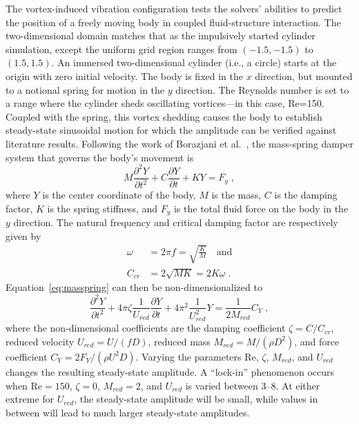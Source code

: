 \documentclass[preprint,12pt]{elsarticle}
\newcommand{ \ddt } [1] { \frac{ \partial #1 }{ \partial t } }
\newcommand{ \ddydxx } [2] { \frac{ \partial^2 #1 }{ \partial #2^2 } }
\begin{document}
The vortex-induced vibration configuration tests the solvers' abilities to predict the
position of a freely moving body in coupled fluid-structure interaction.
The two-dimensional domain matches that as the impulsively started cylinder simulation,
except the uniform grid region ranges from $(-1.5, -1.5)$ to $(1.5, 1.5)$.
An immersed two-dimensional cylinder (i.e., a circle) starts at the origin with
zero initial velocity. The body is fixed in the $x$ direction, but mounted to a
notional spring for motion in the $y$ direction.
The Reynolds number is set to a range where
the cylinder sheds oscillating vortices---in this case, Re=150.
Coupled with the spring, this vortex shedding causes the body to establish
steady-state sinusoidal motion
for which the amplitude can be verified against literature results.
Following the work of Borazjani et al.~\cite{borazjani2008curvilinear}, the mass-spring
damper system that governs the body's movement is
\begin{equation}
    M \ddydxx{Y}{t} + C \ddt{Y} + KY = F_y \;, \label{eq:masspring}
\end{equation}
where $Y$ is the center coordinate of the body, $M$ is the mass, $C$ is the damping factor,
$K$ is the spring stiffness, and $F_y$ is the total fluid force on the body in the $y$ direction.
The natural frequency and critical damping factor are respectively given by
\begin{align}
    \omega &= 2\pi f = \sqrt{\frac{K}{M}} \quad \text{and} \label{eq:nf}\\
    C_{cr} &= 2\sqrt{MK} = 2K\omega \;. \label{eq:cd}
\end{align}
Equation~\eqref{eq:masspring} can then be non-dimensionalized to
\begin{equation}
    \frac{\partial^2 Y}{\partial t^2}+4\pi \zeta\frac{1}{U_{red}}\frac{\partial Y}{\partial t}
     + 4\pi^2\frac{1}{U_{red}^2}Y=\frac{1}{2M_{red}}C_Y \;,
     \label{eq:ndmasspring}
\end{equation}
where the non-dimensional coefficients are the damping coefficient $\zeta=C / C_{cr}$,
reduced velocity $U_{red}=U / (fD)$, reduced mass $M_{red}=M / \left(\rho D^2 \right)$,
and force coefficient $C_Y= 2 F_Y  / \left( \rho U^2 D \right)$.
Varying the parameters Re, $\zeta$,
$M_{red}$, and $U_{red}$ changes the resulting steady-state amplitude.
A ``lock-in'' phenomenon occurs when
$\text{Re}=150$, $\zeta=0$, $M_{red}=2$, and $U_{red}$ is varied between \numrange{3}{8}.
At either extreme for $U_{red}$, the steady-state amplitude will be small, while
values in between will lead to much larger steady-state amplitudes.
\end{document}
